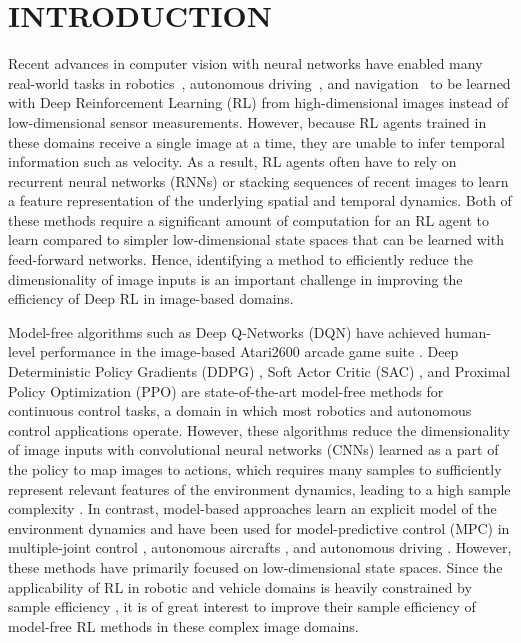 \section{INTRODUCTION}

Recent advances in computer vision with neural networks have enabled many real-world tasks in robotics~\cite{ebert2018visual, pinto2017asymmetric, levine2016end, peters2006policy}, autonomous driving~\cite{zhu2017target, wang2018deep}, and navigation~\cite{li2018reinforcement} to be learned with Deep Reinforcement Learning (RL) from high-dimensional images instead of low-dimensional sensor measurements. However, because RL agents trained in these domains receive a single image at a time, they are unable to infer temporal information such as velocity. As a result, RL agents often have to rely on recurrent neural networks (RNNs) or stacking sequences of recent images \cite{mnih2015human} to learn a feature representation of the underlying spatial and temporal dynamics. Both of these methods require a significant amount of computation for an RL agent to learn compared to simpler low-dimensional state spaces that can be learned with feed-forward networks. Hence, identifying a method to efficiently reduce the dimensionality of image inputs is an important challenge in improving the efficiency of Deep RL in image-based domains.

Model-free algorithms such as Deep Q-Networks (DQN) have achieved human-level performance in the image-based Atari2600 arcade game suite \cite{mnih2013playing, mnih2015human}. Deep Deterministic Policy Gradients (DDPG) \cite{lillicrap2015continuous}, Soft Actor Critic (SAC) \cite{haarnoja2018soft}, and Proximal Policy Optimization (PPO) \cite{schulman2017proximal} are state-of-the-art model-free methods for continuous control tasks, a domain in which most robotics and autonomous control applications operate. However, these algorithms reduce the dimensionality of image inputs with convolutional neural networks (CNNs) learned as a part of the policy to map images to actions, which requires many samples to sufficiently represent relevant features of the environment dynamics, leading to a high sample complexity \cite{buckman2018sample}. In contrast, model-based approaches learn an explicit model of the environment dynamics and have been used for model-predictive control (MPC) in multiple-joint control \cite{nagabandi2018neural, feinberg2018model, kurutach2018model, clavera2018model}, autonomous aircrafts \cite{abbeel2010autonomous}, and autonomous driving \cite{williams2017information}. However, these methods have primarily focused on low-dimensional state spaces. Since the applicability of RL in robotic and vehicle domains is heavily constrained by sample efficiency \cite{williams2017information, pinto2017asymmetric, danielczuk2019mechanical}, it is of great interest to improve their sample efficiency of model-free RL methods in these complex image domains.

